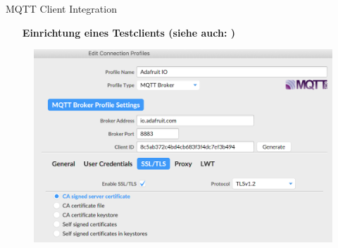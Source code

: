 \begin{frame}{MQTT Client Integration}
        \begin{itemize}
        \setlength{\itemindent}{4.1in}
        \item [\textbf{Einrichtung eines Testclients (siehe auch:  \cite{Adafruit MQTTFx Setup}) }]
    \end{itemize}
      \vspace*{-5mm}

  \begin{figure}[!htb]
  \hspace*{2mm}
        \includegraphics[scale=0.4]{7-datenaustausch/img/mqttfxsettings} 
    \end{figure}
\end{frame}

